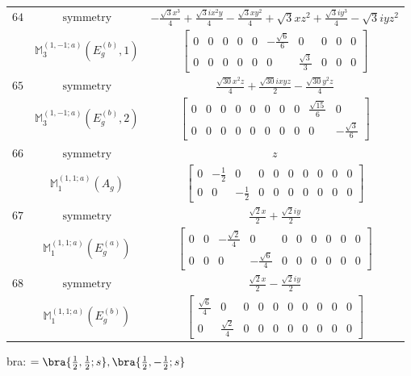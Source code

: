 \documentclass[fleqn,8pt,landscape]{jsarticle}
\begin{document}
\begin{longtable}{ccc}
$ 64 $ & $ \text{symmetry} $ & $ - \frac{\sqrt{3} x^{3}}{4} + \frac{\sqrt{3} i x^{2} y}{4} - \frac{\sqrt{3} x y^{2}}{4} + \sqrt{3} x z^{2} + \frac{\sqrt{3} i y^{3}}{4} - \sqrt{3} i y z^{2} $ \\
$  $ & $ \mathbb{M}_{3}^{(1,-1;a)}(E_{g}^{(b)},1) $ & $ \begin{bmatrix} 0 & 0 & 0 & 0 & 0 & - \frac{\sqrt{6}}{6} & 0 & 0 & 0 & 0 \\ 0 & 0 & 0 & 0 & 0 & 0 & \frac{\sqrt{3}}{3} & 0 & 0 & 0 \end{bmatrix} $ \\ \hline
$ 65 $ & $ \text{symmetry} $ & $ \frac{\sqrt{30} x^{2} z}{4} + \frac{\sqrt{30} i x y z}{2} - \frac{\sqrt{30} y^{2} z}{4} $ \\
$  $ & $ \mathbb{M}_{3}^{(1,-1;a)}(E_{g}^{(b)},2) $ & $ \begin{bmatrix} 0 & 0 & 0 & 0 & 0 & 0 & 0 & 0 & \frac{\sqrt{15}}{6} & 0 \\ 0 & 0 & 0 & 0 & 0 & 0 & 0 & 0 & 0 & - \frac{\sqrt{3}}{6} \end{bmatrix} $ \\ \hline
$ 66 $ & $ \text{symmetry} $ & $ z $ \\
$  $ & $ \mathbb{M}_{1}^{(1,1;a)}(A_{g}) $ & $ \begin{bmatrix} 0 & - \frac{1}{2} & 0 & 0 & 0 & 0 & 0 & 0 & 0 & 0 \\ 0 & 0 & - \frac{1}{2} & 0 & 0 & 0 & 0 & 0 & 0 & 0 \end{bmatrix} $ \\ \hline
$ 67 $ & $ \text{symmetry} $ & $ \frac{\sqrt{2} x}{2} + \frac{\sqrt{2} i y}{2} $ \\
$  $ & $ \mathbb{M}_{1}^{(1,1;a)}(E_{g}^{(a)}) $ & $ \begin{bmatrix} 0 & 0 & - \frac{\sqrt{2}}{4} & 0 & 0 & 0 & 0 & 0 & 0 & 0 \\ 0 & 0 & 0 & - \frac{\sqrt{6}}{4} & 0 & 0 & 0 & 0 & 0 & 0 \end{bmatrix} $ \\ \hline
$ 68 $ & $ \text{symmetry} $ & $ \frac{\sqrt{2} x}{2} - \frac{\sqrt{2} i y}{2} $ \\
$  $ & $ \mathbb{M}_{1}^{(1,1;a)}(E_{g}^{(b)}) $ & $ \begin{bmatrix} \frac{\sqrt{6}}{4} & 0 & 0 & 0 & 0 & 0 & 0 & 0 & 0 & 0 \\ 0 & \frac{\sqrt{2}}{4} & 0 & 0 & 0 & 0 & 0 & 0 & 0 & 0 \end{bmatrix} $ \\ \hline
\end{longtable}
bra: $=\bra{\frac{1}{2},\frac{1}{2};s}, \bra{\frac{1}{2},- \frac{1}{2};s}$
\end{document}
